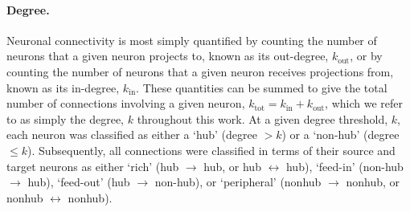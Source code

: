\documentclass[10pt,letterpaper]{article}
\begin{document}
\paragraph{Degree.}
Neuronal connectivity is most simply quantified by counting the number of neurons that a given neuron projects to, known as its out-degree, $k_\mathrm{out}$, or by counting the number of neurons that a given neuron receives projections from, known as its in-degree, $k_\mathrm{in}$.
These quantities can be summed to give the total number of connections involving a given neuron, $k_\mathrm{tot} = k_\mathrm{in} + k_\mathrm{out}$, which we refer to as simply the degree, $k$ throughout this work.
At a given degree threshold, $k$, each neuron was classified as either a `hub' (degree $>k$) or a `non-hub' (degree $\leq k$).
Subsequently, all connections were classified in terms of their source and target neurons as either
`rich' (hub $\rightarrow$ hub, or hub $\leftrightarrow$ hub),
`feed-in' (non-hub $\rightarrow$ hub),
`feed-out' (hub $\rightarrow$ non-hub),
or `peripheral' (nonhub $\rightarrow$ nonhub, or nonhub $\leftrightarrow$ nonhub).
\end{document}
